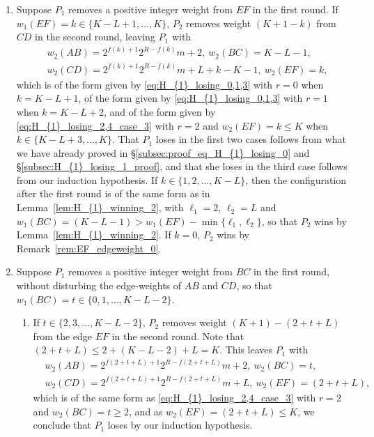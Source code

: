 \documentclass[11pt,reqno]{amsart}
\theoremstyle{definition}
\theoremstyle{definition}
\begin{document}
\begin{enumerate}
The second possibility is that $w_{1}(AB)=2^{R+1}n+\ell_{1}$ for some $n < m$ and some $\ell_{1}\in\{0,1,\ldots,2^{R+1}-1\}$. In this case, the configuration after the first round is of the same form as in Lemma~\ref{prop:H_{1}_winning_1}, with $m_{1}=n$, $m_{2}=m$ and $\ell_{2}=L$, and as $n < m \implies m_{1}\neq m_{2}$, we know that $P_{2}$ wins by Lemma~\ref{prop:H_{1}_winning_1}.

\item Suppose $P_{1}$ removes a positive integer weight from $EF$ in the first round. If $w_{1}(EF)=k\in\{K-L+1,\ldots,K\}$, $P_{2}$ removes weight $(K+1-k)$ from $CD$ in the second round, leaving $P_{1}$ with
\begin{align}
{}&w_{2}(AB)=2^{f(k)+1}2^{R-f(k)}m+2,\ w_{2}(BC)=K-L-1,\nonumber\\
{}&w_{2}(CD)=2^{f(k)+1}2^{R-f(k)}m+L+k-K-1,\ w_{2}(EF)=k,\nonumber
\end{align}
which is of the form given by \eqref{eq:H_{1}_losing_0,1,3} with $r=0$ when $k=K-L+1$, of the form given by \eqref{eq:H_{1}_losing_0,1,3} with $r=1$ when $k=K-L+2$, and of the form given by \eqref{eq:H_{1}_losing_2,4_case_3} with $r=2$ and $w_{2}(EF)=k\leqslant K$ when $k\in\{K-L+3,\ldots,K\}$. That $P_{1}$ loses in the first two cases follows from what we have already proved in \S\ref{subsec:proof_eq_H_{1}_losing_0} and \S\ref{subsec:H_{1}_losing_1_proof}, and that she loses in the third case follows from our induction hypothesis. If $k\in\{1,2,\ldots,K-L\}$, then the configuration after the first round is of the same form as in Lemma~\ref{lem:H_{1}_winning_2}, with $\ell_{1}=2$, $\ell_{2}=L$ and $w_{1}(BC)=(K-L-1)>w_{1}(EF)-\min\{\ell_{1},\ell_{2}\}$, so that $P_{2}$ wins by Lemma~\ref{lem:H_{1}_winning_2}. If $k=0$, $P_{2}$ wins by Remark~\ref{rem:EF_edgeweight_0}.

\item Suppose $P_{1}$ removes a positive integer weight from $BC$ in the first round, without disturbing the edge-weights of $AB$ and $CD$, so that $w_{1}(BC)=t \in\{0,1,\ldots,K-L-2\}$.
\begin{enumerate}
\item If $t \in \{2,3,\ldots,K-L-2\}$, $P_{2}$ removes weight $(K+1)-(2+t+L)$ from the edge $EF$ in the second round. Note that $(2+t+L)\leqslant 2+(K-L-2)+L=K$. This leaves $P_{1}$ with
\begin{align}
{}&w_{2}(AB)=2^{f(2+t+L)+1}2^{R-f(2+t+L)}m+2,\ w_{2}(BC)=t,\nonumber\\
{}&w_{2}(CD)=2^{f(2+t+L)+1}2^{R-f(2+t+L)}m+L,\ w_{2}(EF)=(2+t+L),\nonumber
\end{align}
which is of the same form as \eqref{eq:H_{1}_losing_2,4_case_3} with $r=2$ and $w_{2}(BC)=t\geqslant 2$, and as $w_{2}(EF)=(2+t+L)\leqslant K$, we conclude that $P_{1}$ loses by our induction hypothesis.


\end{enumerate}
\end{enumerate}
\end{document}
